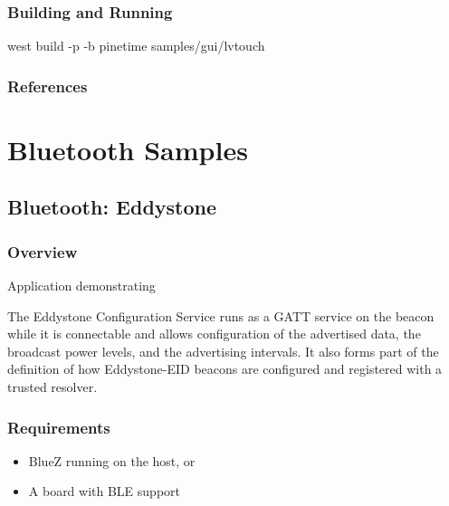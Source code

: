 \documentclass[letterpaper,10pt,english]{sphinxmanual}
\begin{document}
\subsubsection{Building and Running}
\label{\detokenize{samples/gui/lvtouch/README:building-and-running}}
west build -p -b pinetime samples/gui/lvtouch


\subsubsection{References}
\label{\detokenize{samples/gui/lvtouch/README:references}}

\section{Bluetooth Samples}
\label{\detokenize{samples/bluetooth/bluetooth:bluetooth-samples}}\label{\detokenize{samples/bluetooth/bluetooth:id1}}\label{\detokenize{samples/bluetooth/bluetooth::doc}}

\subsection{Bluetooth: Eddystone}
\label{\detokenize{samples/bluetooth/eddystone/README:bluetooth-eddystone}}\label{\detokenize{samples/bluetooth/eddystone/README:bluetooth-eddystone-sample}}\label{\detokenize{samples/bluetooth/eddystone/README::doc}}

\subsubsection{Overview}
\label{\detokenize{samples/bluetooth/eddystone/README:overview}}
Application demonstrating 

The Eddystone Configuration Service runs as a GATT service on the beacon while
it is connectable and allows configuration of the advertised data, the
broadcast power levels, and the advertising intervals. It also forms part of
the definition of how Eddystone-EID beacons are configured and registered with
a trusted resolver.


\subsubsection{Requirements}
\label{\detokenize{samples/bluetooth/eddystone/README:requirements}}\begin{itemize}
\item {} 
BlueZ running on the host, or

\item {} 
A board with BLE support

\end{itemize}
\end{document}
